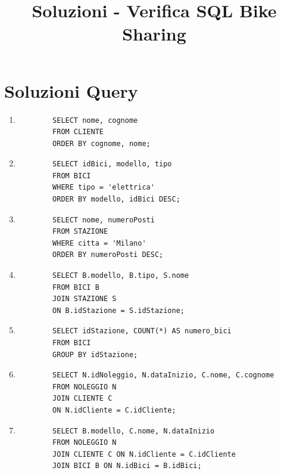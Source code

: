 \documentclass[a4paper,12pt]{article}
\title{Soluzioni - Verifica SQL Bike Sharing}
\date{}
\begin{document}
\maketitle

\section*{Soluzioni Query}

\begin{enumerate}
	
	\item
	\begin{verbatim}
		SELECT nome, cognome
		FROM CLIENTE
		ORDER BY cognome, nome;
	\end{verbatim}
	
	\item
	\begin{verbatim}
		SELECT idBici, modello, tipo
		FROM BICI
		WHERE tipo = 'elettrica'
		ORDER BY modello, idBici DESC;
	\end{verbatim}
	
	\item
	\begin{verbatim}
		SELECT nome, numeroPosti
		FROM STAZIONE
		WHERE citta = 'Milano'
		ORDER BY numeroPosti DESC;
	\end{verbatim}
	
	\item
	\begin{verbatim}
		SELECT B.modello, B.tipo, S.nome
		FROM BICI B
		JOIN STAZIONE S
		ON B.idStazione = S.idStazione;
	\end{verbatim}
	
	\item
	\begin{verbatim}
		SELECT idStazione, COUNT(*) AS numero_bici
		FROM BICI
		GROUP BY idStazione;
	\end{verbatim}
	
	\item
	\begin{verbatim}
		SELECT N.idNoleggio, N.dataInizio, C.nome, C.cognome
		FROM NOLEGGIO N
		JOIN CLIENTE C
		ON N.idCliente = C.idCliente;
	\end{verbatim}
	
	\item
	\begin{verbatim}
		SELECT B.modello, C.nome, N.dataInizio
		FROM NOLEGGIO N
		JOIN CLIENTE C ON N.idCliente = C.idCliente
		JOIN BICI B ON N.idBici = B.idBici;
	\end{verbatim}
	

\end{enumerate}
\end{document}
